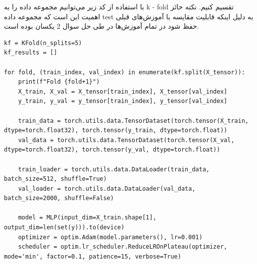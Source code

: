\documentclass{article}
\begin{document}
با استفاده از کد زیر می‌‌توانیم مجموعه داده را به 
k - fold
تقسیم کنیم. نکته حائز اهمیت این است که مجموعه داده 
test
به دلیل اینکه قابلیت مقایسه با آموزش‌های قبلی حفظ شود در تمام آموزش‌ها در طی حل سوال 2 یکسان بوده است.

\begin{LTR}  
	\begin{lstlisting}       
kf = KFold(n_splits=5)
kf_results = []

for fold, (train_index, val_index) in enumerate(kf.split(X_tensor)):
    print(f"Fold {fold+1}")
    X_train, X_val = X_tensor[train_index], X_tensor[val_index]
    y_train, y_val = y_tensor[train_index], y_tensor[val_index]
    
    train_data = torch.utils.data.TensorDataset(torch.tensor(X_train, dtype=torch.float32), torch.tensor(y_train, dtype=torch.float))
    val_data = torch.utils.data.TensorDataset(torch.tensor(X_val, dtype=torch.float32), torch.tensor(y_val, dtype=torch.float))
    
    train_loader = torch.utils.data.DataLoader(train_data, batch_size=512, shuffle=True)
    val_loader = torch.utils.data.DataLoader(val_data, batch_size=2000, shuffle=False)
    
    model = MLP(input_dim=X_train.shape[1], output_dim=len(set(y))).to(device)
    optimizer = optim.Adam(model.parameters(), lr=0.001)
    scheduler = optim.lr_scheduler.ReduceLROnPlateau(optimizer, mode='min', factor=0.1, patience=15, verbose=True)
	\end{lstlisting}
\end{LTR}    
\end{document}
